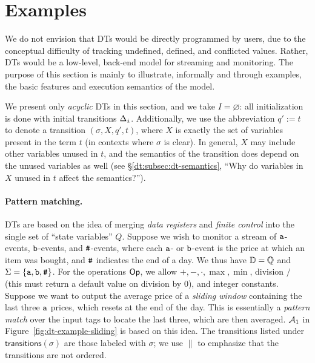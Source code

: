 \section{Examples}
\label{subsec:dt-examples}

We do not envision that DTs would be directly programmed by users, due to the conceptual difficulty of tracking undefined, defined, and conflicted values. Rather, DTs would be a low-level, back-end model for streaming and monitoring.
The purpose of this section is mainly to illustrate, informally and through examples, the basic features and execution semantics of the model.

We present only \emph{acyclic} DTs in this section, and we take $I = \varnothing$: all initialization is done with initial transitions $\Delta_{\texttt{i}}$. Additionally, we use the abbreviation $q' := t$ to denote a transition $(\sigma, X, q', t)$, where $X$ is exactly the set of variables present in the term $t$ (in contexts where $\sigma$ is clear). In general, $X$ may include other variables unused in $t$, and the semantics of the transition does depend on the unused variables as well (see \S\ref{dt:subsec:dt-semantics}, ``Why do variables in $X$ unused in $t$ affect the semantics?'').

\paragraph*{Pattern matching.}
DTs are based on the idea of merging \emph{data registers} and \emph{finite control} into the single set of ``state variables'' $Q$.
Suppose we wish to monitor a stream of $\texttt{a}$-events, $\texttt{b}$-events, and $\texttt{\#}$-events, where each $\texttt{a}$- or $\texttt{b}$-event is the price at which an item was bought, and $\texttt{\#}$ indicates the end of a day. We thus have $\mathbb{D} = \mathbb{Q}$ and $\Sigma = \{\texttt{a}, \texttt{b}, \texttt{\#}\}$. For the operations $\textsf{Op}$, we allow $+, -, \cdot, \max, \min$, division $/$ (this must return a default value on division by $0$), and integer constants.
Suppose we want to output the average price of a \emph{sliding window} containing the last three $\texttt{a}$ prices, which resets at the end of the day.
This is essentially a \emph{pattern match} over the input tags to locate the last three, which are then averaged. $\mathcal{A}_1$ in Figure~\ref{fig:dt-example-sliding} is based on this idea.
The transitions listed under $\textsf{transitions}(\sigma)$ are those labeled with $\sigma$;
we use $\parallel{}$ to emphasize that the transitions are not ordered.

